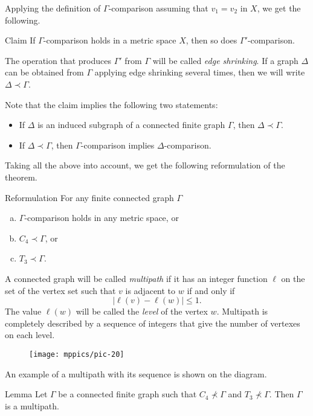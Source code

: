\documentclass{article}
\begin{document}
Applying the definition of $\Gamma$-comparison assuming that $v_1=v_2$ in $X$, we get the following.

\begin{thm}{Claim}
If $\Gamma$-comparison holds in a metric space $X$, then so does $\Gamma'$-comparison.

\end{thm}

The operation that produces $\Gamma'$ from $\Gamma$ will be called \emph{edge shrinking}.
If a graph $\Delta$ can be obtained from $\Gamma$ applying edge shrinking several times, then we will write $\Delta\prec \Gamma$.

Note that the claim implies the following two statements:
\begin{itemize}
 \item If $\Delta$ is an induced subgraph of a connected finite graph $\Gamma$, then $\Delta\prec \Gamma$.
 \item If $\Delta\prec \Gamma$, then $\Gamma$-comparison implies $\Delta$-comparison.
\end{itemize}
Taking all the above into account, we get the following reformulation of the theorem.

\begin{thm}{Reformulation}
For any finite connected graph $\Gamma$
\begin{enumerate}[(a)]
\item $\Gamma$-comparison holds in any metric space,  or
\item $C_4\prec \Gamma$, or
\item $T_3\prec \Gamma$.
\end{enumerate}
\end{thm}

A connected graph will be called \emph{multipath} if it has an integer function $\ell$ on the set of the vertex set such that 
$v$ is adjacent to $w$ if and only if $$|\ell(v)-\ell(w)|\le 1.$$
The value $\ell(w)$ will be called the \emph{level} of the vertex $w$.
Multipath is completely described by a sequence of integers that give the number of vertexes on each level.
\begin{figure}[ht!]
\centering
\medskip
\texttt{[image: mppics/pic-20]}
\medskip
\end{figure}
An example of a multipath with its sequence is shown on the diagram. 

\begin{thm}{Lemma}
Let $\Gamma$ be a connected finite graph such that $C_4\nprec\Gamma$ and  $T_3\nprec\Gamma$.
Then $\Gamma$ is a multipath.
\end{thm}
\end{document}

